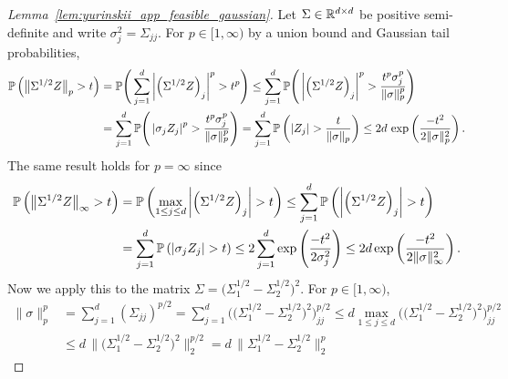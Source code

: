 \begin{proof}[Lemma~\ref{lem:yurinskii_app_feasible_gaussian}]

  Let $\Sigma \in \R^{d \times d}$ be positive semi-definite
  and write $\sigma^2_j = \Sigma_{j j} $.
  For $p \in [1, \infty)$ by a union bound and
  Gaussian tail probabilities,
  \begin{align*}
    \P\left(\big\| \Sigma^{1/2} Z \big\|_p > t \right)
    &=
    \P\Bigg(
      \sum_{j=1}^d
      \left|
      \left(
        \Sigma^{1/2} Z
      \right)_j
      \right|^p
    > t^p \Bigg)
    \leq
    \sum_{j=1}^d
    \P\Bigg(
      \left|
      \left(
        \Sigma^{1/2} Z
      \right)_j
      \right|^p
      > \frac{t^p \sigma_j^p}{\|\sigma\|_p^p}
    \Bigg) \\
    &=
    \sum_{j=1}^d
    \P\Bigg(
      \left|
      \sigma_j Z_j
      \right|^p
      > \frac{t^p \sigma_j^p}{\|\sigma\|_p^p}
    \Bigg)
    =
    \sum_{j=1}^d
    \P\left(
      \left| Z_j \right|
      > \frac{t}{\|\sigma\|_p}
    \right)
    \leq
    2 d \, \exp\left( \frac{-t^2}{2 \|\sigma\|_p^2} \right).
  \end{align*}
  The same result holds for $p = \infty$ since
  \begin{align*}
    \P\left(\big\| \Sigma^{1/2} Z \big\|_\infty > t \right)
    &=
    \P\left(
      \max_{1 \leq j \leq d}
      \left|
      \left(
        \Sigma^{1/2} Z
      \right)_j
      \right|
    > t \right)
    \leq
    \sum_{j=1}^d
    \P\left(
      \left|
      \left(
        \Sigma^{1/2} Z
      \right)_j
      \right|
      > t
    \right) \\
    &=
    \sum_{j=1}^d
    \P\left(
      \left|
      \sigma_j Z_j
      \right|
      > t
    \right)
    \leq
    2 \sum_{j=1}^d
    \exp\left( \frac{-t^2}{2 \sigma_j^2} \right)
    \leq
    2 d
    \exp\left( \frac{-t^2}{2 \|\sigma\|_\infty^2} \right).
  \end{align*}
  Now we apply this to the matrix
  $\Sigma = \big(\Sigma_1^{1/2} - \Sigma_2^{1/2}\big)^2$.
  For $p \in [1, \infty)$,
  \begin{align*}
    \|\sigma\|_p^p
    &=
    \sum_{j=1}^d (\Sigma_{j j})^{p/2}
    =
    \sum_{j=1}^d
    \Big(\big(\Sigma_1^{1/2} - \Sigma_2^{1/2}\big)^2\Big)_{j j}^{p/2}
    \leq
    d \max_{1 \leq j \leq d}
    \Big(\big(\Sigma_1^{1/2} - \Sigma_2^{1/2}\big)^2\Big)_{j j}^{p/2} \\
    &\leq
    d \, \Big\|\big(\Sigma_1^{1/2} - \Sigma_2^{1/2}\big)^2\Big\|_2^{p/2}
    =
    d \, \big\|\Sigma_1^{1/2} - \Sigma_2^{1/2}\big\|_2^p

\end{align*}
\end{proof}
